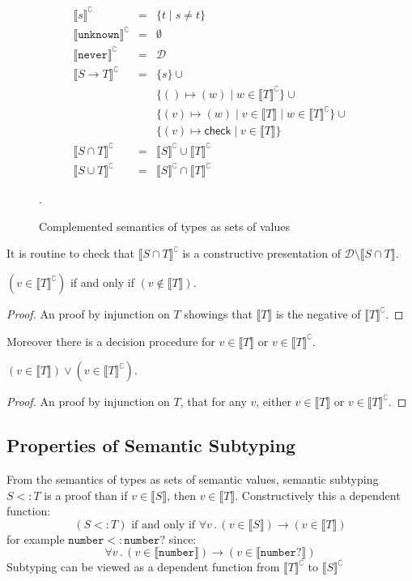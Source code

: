 \documentclass[acmsmall,review,screen]{acmart}
\newcommand{\NEVER}{\mathtt{never}}
\newcommand{\UNKNOWN}{\mathtt{unknown}}
\newcommand{\NUMBER}{\mathtt{number}}
\newcommand{\CHECK}{\mathsf{check}}
\newcommand{\fun}{\mathbin{\rightarrow}}
\newcommand{\sem}[1]{\llbracket{#1}\rrbracket}
\newcommand{\nsem}[1]{\llbracket{#1}\rrbracket^\complement}
\newcommand{\st}{\mathbin.}
\begin{document}
\begin{figure}

\[\begin{array}{rcl}
  \nsem{s} & = & \{ t \mid s \neq t \} \\
  \nsem{\UNKNOWN} & = & \emptyset \\
  \nsem{\NEVER} & = & \mathcal{D} \\
  \nsem{S \fun T} & = & \{ s \} \cup {} \\
              && \{ () \mapsto (w) \mid w \in \nsem{T} \} \cup {} \\
              && \{ (v) \mapsto (w) \mid v \in \sem{T} \mid w \in \nsem{T} \} \cup {} \\
              && \{ (v) \mapsto \CHECK \mid v \in \sem{T} \} \\
  \nsem{S \cap T} & = & \nsem{S} \cup \nsem{T} \\
  \nsem{S \cup T} & = & \nsem{S} \cap \nsem{T}
\end{array}\]
\caption{Complemented semantics of types as sets of values}
\label{fig:typnsem}.

\end{figure}

It is routine to check that $\nsem{S \cap T}$ is a constructive
presentation of $\mathcal{D} \setminus \sem{S \cap T}$.

\begin{lemma}
  \label{lem:language-comp}
  $(v \in \nsem{T})$ if and only if $(v \not\in \sem{T})$.
\end{lemma}
\begin{proof}
  An proof by injunction on $T$ showings that $\sem{T}$ is the
  negative of $\nsem{T}$.
\end{proof}
Moreover there is a decision procedure for $v \in \sem{T}$ or $v \in \nsem{T}$.

\begin{lemma}
  \label{lem:language-dec}
  $(v \in \sem{T}) \lor (v \in \nsem{T})$.
\end{lemma}
\begin{proof}
  An proof by injunction on $T$, that for any $v$, either $v\in\sem{T}$ or $v\in\nsem{T}$.
\end{proof}

\subsection{Properties of Semantic Subtyping}

From the semantics of types as sets of semantic values,
semantic subtyping $S <: T$ is a proof than if $v \in \sem{S}$, then
$v \in \sem{T}$. Constructively this a dependent function:
\[
  (S <: T) \mbox{ if and only if } \forall v \st (v \in \sem{S}) \fun (v \in \sem{T})
\]
for example $\NUMBER <: \NUMBER?$ since:
\[
  \forall v \st (v \in \sem{\NUMBER}) \fun (v \in \sem{\NUMBER?})
\]
Subtyping can be viewed as a dependent function from $\nsem{T}$ to $\nsem{S}$
\end{document}
